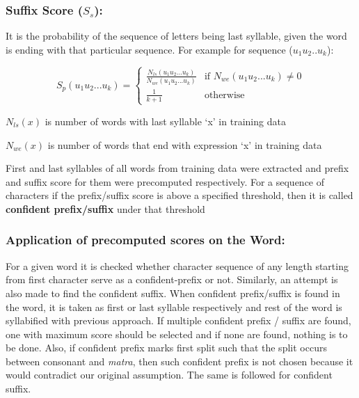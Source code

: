 \documentclass[runningheads,a4paper]{llncs}
\begin{document}
\subsubsection*{Suffix Score ($S_s$): }
It is the probability of the sequence of letters being last syllable, given the word is ending with that particular sequence. For example for sequence ($u_1u_2..u_k$):

\begin{equation}
	S_p(u_1u_2...u_k)
	=
	\begin{cases}
		\frac{  N_{ls}( u_1u_2...u_k ) }{ N_{we}( u_1u_2...u_k ) } & \mbox{if } N_{we}( u_1u_2...u_k ) \neq 0 \\
		\frac{ 1 }{ k + 1 } & \mbox{otherwise}
	\end{cases}
\end{equation}

\begin{small}
$N_{ls}( x )$ is number of words with last syllable `x' in training data

$N_{we}( x )$ is number of words that end with expression `x' in training data
\end{small}

First and last syllables of all words from training data were extracted and prefix and suffix score for them were precomputed respectively. For a sequence of characters if the prefix/suffix score is above a specified threshold, then it is called \textbf{confident prefix/suffix} under that threshold

\subsubsection*{Application of precomputed scores on the Word: }
 
For a given word it is checked whether character sequence of any length starting from first character serve as a confident-prefix or not. Similarly, an attempt is also made to find the confident suffix. When confident prefix/suffix is found in the word, it is taken as first or last syllable respectively and rest of the word is syllabified with previous approach. If multiple confident prefix / suffix are found, one with maximum score should be selected and if none are found, nothing is to be done. Also, if confident prefix marks first split such that the split occurs between consonant and \emph{matra},  then such confident prefix is not chosen because it would contradict our original assumption. The same is followed for confident suffix.
\end{document}
